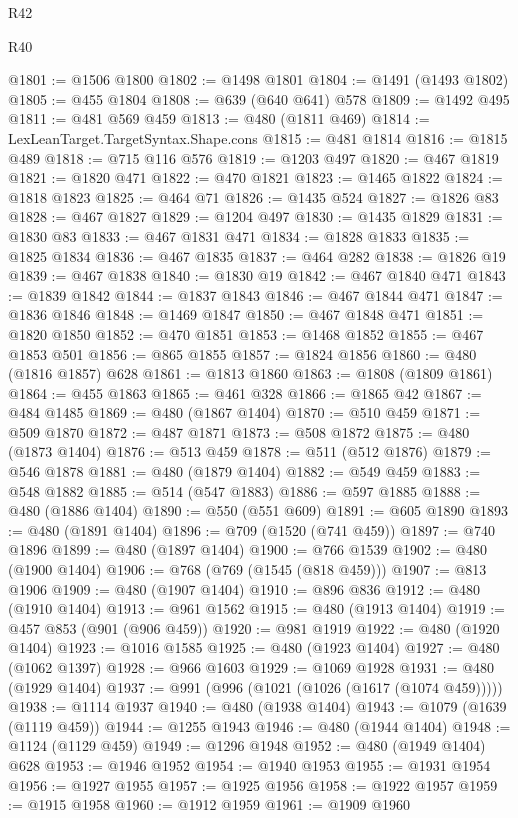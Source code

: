 \begin{lexlean}{R42}
\begin{lexlean}{R40}
\begin{coremodule}
{{{{{{{{{{{{{{{{{{{{{{{{{{{{{{{{{{{{{{{{{{{{{{{{{{{{{{{{{{{{{{{{{{{{{{{{{{{{{{{{{{{{{{{{{{{{{{{{{{{{{{{{{{{{{@1801 := @1506 @1800
@1802 := @1498 @1801
@1804 := @1491 (@1493 @1802)
@1805 := @455 @1804
@1808 := @639 (@640 @641) @578
@1809 := @1492 @495
@1811 := @481 @569 @459
@1813 := @480 (@1811 @469)
@1814 := LexLeanTarget.TargetSyntax.Shape.cons
@1815 := @481 @1814
@1816 := @1815 @489
@1818 := @715 @116 @576
@1819 := @1203 @497
@1820 := @467 @1819
@1821 := @1820 @471
@1822 := @470 @1821
@1823 := @1465 @1822
@1824 := @1818 @1823
@1825 := @464 @71
@1826 := @1435 @524
@1827 := @1826 @83
@1828 := @467 @1827
@1829 := @1204 @497
@1830 := @1435 @1829
@1831 := @1830 @83
@1833 := @467 @1831 @471
@1834 := @1828 @1833
@1835 := @1825 @1834
@1836 := @467 @1835
@1837 := @464 @282
@1838 := @1826 @19
@1839 := @467 @1838
@1840 := @1830 @19
@1842 := @467 @1840 @471
@1843 := @1839 @1842
@1844 := @1837 @1843
@1846 := @467 @1844 @471
@1847 := @1836 @1846
@1848 := @1469 @1847
@1850 := @467 @1848 @471
@1851 := @1820 @1850
@1852 := @470 @1851
@1853 := @1468 @1852
@1855 := @467 @1853 @501
@1856 := @865 @1855
@1857 := @1824 @1856
@1860 := @480 (@1816 @1857) @628
@1861 := @1813 @1860
@1863 := @1808 (@1809 @1861)
@1864 := @455 @1863
@1865 := @461 @328
@1866 := @1865 @42
@1867 := @484 @1485
@1869 := @480 (@1867 @1404)
@1870 := @510 @459
@1871 := @509 @1870
@1872 := @487 @1871
@1873 := @508 @1872
@1875 := @480 (@1873 @1404)
@1876 := @513 @459
@1878 := @511 (@512 @1876)
@1879 := @546 @1878
@1881 := @480 (@1879 @1404)
@1882 := @549 @459
@1883 := @548 @1882
@1885 := @514 (@547 @1883)
@1886 := @597 @1885
@1888 := @480 (@1886 @1404)
@1890 := @550 (@551 @609)
@1891 := @605 @1890
@1893 := @480 (@1891 @1404)
@1896 := @709 (@1520 (@741 @459))
@1897 := @740 @1896
@1899 := @480 (@1897 @1404)
@1900 := @766 @1539
@1902 := @480 (@1900 @1404)
@1906 := @768 (@769 (@1545 (@818 @459)))
@1907 := @813 @1906
@1909 := @480 (@1907 @1404)
@1910 := @896 @836
@1912 := @480 (@1910 @1404)
@1913 := @961 @1562
@1915 := @480 (@1913 @1404)
@1919 := @457 @853 (@901 (@906 @459))
@1920 := @981 @1919
@1922 := @480 (@1920 @1404)
@1923 := @1016 @1585
@1925 := @480 (@1923 @1404)
@1927 := @480 (@1062 @1397)
@1928 := @966 @1603
@1929 := @1069 @1928
@1931 := @480 (@1929 @1404)
@1937 := @991 (@996 (@1021 (@1026 (@1617 (@1074 @459)))))
@1938 := @1114 @1937
@1940 := @480 (@1938 @1404)
@1943 := @1079 (@1639 (@1119 @459))
@1944 := @1255 @1943
@1946 := @480 (@1944 @1404)
@1948 := @1124 (@1129 @459)
@1949 := @1296 @1948
@1952 := @480 (@1949 @1404) @628
@1953 := @1946 @1952
@1954 := @1940 @1953
@1955 := @1931 @1954
@1956 := @1927 @1955
@1957 := @1925 @1956
@1958 := @1922 @1957
@1959 := @1915 @1958
@1960 := @1912 @1959
@1961 := @1909 @1960
}}}}}}}}}}}}}}}}}}}}}}}}}}}}}}}}}}}}}}}}}}}}}}}}}}}}}}}}}}}}}}}}}}}}}}}}}}}}}}}}}}}}}}}}}}}}}}}}}}}}}}}}}}}}}
\end{coremodule}
\end{lexlean}
\end{lexlean}
